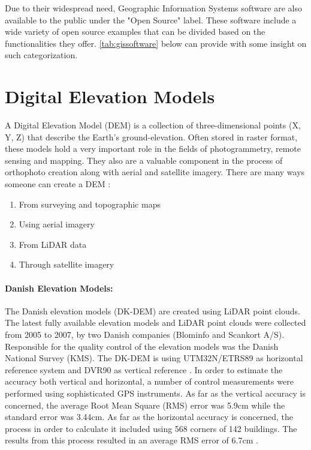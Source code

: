 Due to their widespread need, Geographic Information Systems software are also available to the public under the "Open Source" label. These software include a wide variety of open source examples that can be divided based on the functionalities they offer. \autoref{tab:gissoftware} below can provide with some insight on such categorization. 

\section{Digital Elevation Models}
A Digital Elevation Model (DEM) is a collection of three-dimensional points (X, Y, Z) that describe the Earth's ground-elevation. Often stored in raster format, these models hold a very important role in the fields of photogrammetry, remote sensing and mapping. They also are a valuable component in the process of orthophoto creation along with aerial and satellite imagery. There are many ways someone can create a DEM \citep{dem}:

\begin{enumerate}
\item From surveying and topographic maps
\item Using aerial imagery
\item From LiDAR data
\item Through satellite imagery
\end{enumerate}

\paragraph{Danish Elevation Models:} The Danish elevation models (DK-DEM) are created using LiDAR point clouds. The latest fully available elevation models and LiDAR point clouds were collected from 2005 to 2007, by two Danish companies (Blominfo and Scankort A/S). Responsible for the quality control of the elevation models was the Danish National Survey (KMS). The DK-DEM is using UTM32N/ETRS89 as horizontal reference system and DVR90 as vertical reference \citep{demdk}.
In order to estimate the accuracy both vertical and horizontal, a number of control measurements were performed using sophisticated GPS instruments. As far as the vertical accuracy is concerned, the average Root Mean Square (RMS) error was 5.9cm while the standard error was 3.44cm. As far as the horizontal accuracy is concerned, the process in order to calculate it included using 568 corners of 142 buildings. The results from this process resulted in an average RMS error of 6.7cm \citep{demdk}.

